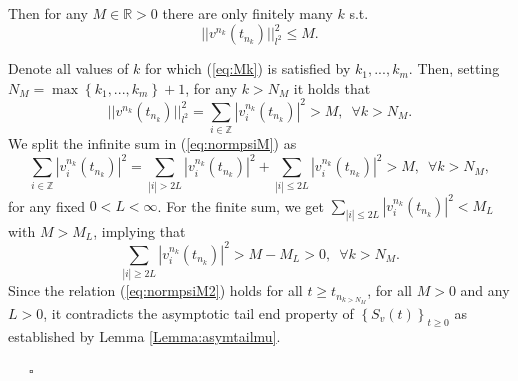 \documentclass[preprintnumbers,amsmath,amssymb]{revtex4}
\begin{document}
 Then for any $M\in {\mathbb{R}}>0$ there are only finitely many $k$ s.t. 
 \begin{equation}
  ||  v^{n_k}(t_{n_k}) ||_{l^2}^2\le M.\label{eq:Mk}
 \end{equation}
 
  Denote all values of $k$ for which (\ref{eq:Mk}) is satisfied by $k_1,...,k_m$. Then, setting $N_M=\max\left\{k_1,...,k_m\right\}+1$, for any $k>N_M$ it holds that
  \begin{equation}
   ||  v^{n_k}(t_{n_k}) ||_{l^2}^2=\sum_{i\in {\mathbb{Z}}}|v^{n_k}_i(t_{n_{k}})|^2>M,\,\,\,\forall k>N_M.\label{eq:normpsiM}
  \end{equation}
 We  split the infinite sum in (\ref{eq:normpsiM}) as
 \begin{equation}
 \sum_{i\in {\mathbb{Z}}}|v^{n_k}_i(t_{n_{k}})|^2=\sum_{|i|>2L}|v^{n_k}_i(t_{n_{k}})|^2+\sum_{|i|\le 2L}|v^{n_k}_i(t_{n_{k}})|^2
 >M,\,\,\,\forall k>N_M,\label{eq:normpsiM1}
  \end{equation}
  for any fixed $0<L<\infty$. For the finite sum, we get $\sum_{|i|\le 2L}|v^{n_k}_i(t_{n_{k}})|^2<M_L$ with $M>M_L$, implying that
  \begin{equation}
 \sum_{|i|\ge 2L}|v^{n_k}_i(t_{n_{k}})|^2
 >M-M_L>0,\,\,\,\forall k>N_M.\label{eq:normpsiM2}
  \end{equation}
  Since the relation (\ref{eq:normpsiM2}) holds for all 
  $t\ge t_{n_{k> N_M}}$, for all $M>0$ and any $L>0$, it contradicts the asymptotic tail end property of $\left\{S_v(t)\right\}_{t\ge 0}$  as established by Lemma \ref{Lemma:asymtailmu}. 
  
  \ \ \ $\square$
\end{document}
